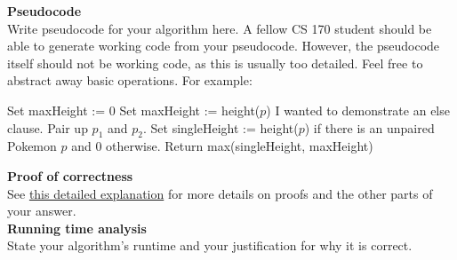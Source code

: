 \documentclass[11pt]{article}
\begin{document}
\noindent
\textbf{Pseudocode}\\

Write pseudocode for your algorithm here. A fellow CS 170 student should be able to generate working code from your pseudocode. However, the pseudocode itself should not be working code, as this is usually too detailed. Feel free to abstract away basic operations. For example:\\

\begin{algorithmic}[0]
\State Set maxHeight := $0$
		\State Set maxHeight := height($p$)
	\Else
		\State I wanted to demonstrate an else clause.
	\EndIf
\EndFor
{}
	\State Pair up $p_1$ and $p_2$.
\EndWhile
\State Set singleHeight := height($p$) if there is an unpaired Pokemon $p$ and 0 otherwise.
\State Return max(singleHeight, maxHeight)
\EndProcedure
\end{algorithmic}

\vspace{0.2in}

\noindent
\textbf{Proof of correctness}\\

See \href{http://www-inst.eecs.berkeley.edu/~cs170/fa14/hws/instruct.pdf}{this detailed explanation} for more details on proofs and the other parts of your answer.\\

\noindent
\textbf{Running time analysis}\\

State your algorithm's runtime and your justification for why it is correct.
\end{document}

